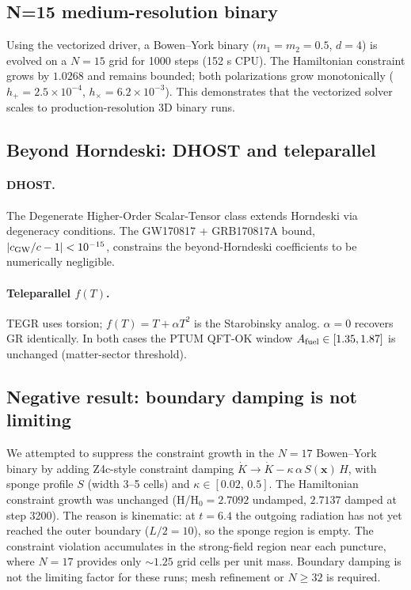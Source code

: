\subsection{N=15 medium-resolution binary}
Using the vectorized driver, a Bowen--York binary ($m_1 = m_2 =
0.5$, $d = 4$) is evolved on a $N = 15$ grid for 1000 steps
(152 s CPU). The Hamiltonian constraint grows by $1.0268$ and
remains bounded; both polarizations grow monotonically
($h_+ = 2.5\times 10^{-4}$, $h_\times = 6.2\times 10^{-3}$).
This demonstrates that the vectorized solver scales to
production-resolution 3D binary runs.

\subsection{Beyond Horndeski: DHOST and teleparallel}
\paragraph{DHOST.}
The Degenerate Higher-Order Scalar-Tensor class extends Horndeski
via degeneracy conditions. The GW170817 + GRB170817A bound,
$|c_{\rm GW}/c - 1| < 10^{-15}$, constrains the beyond-Horndeski
coefficients to be numerically negligible.
\paragraph{Teleparallel $f(T)$.}
TEGR uses torsion; $f(T) = T + \alpha T^2$ is the Starobinsky
analog. $\alpha = 0$ recovers GR identically.
In both cases the PTUM QFT-OK window $A_{\rm fuel} \in [1.35,
1.87]$ is unchanged (matter-sector threshold).

\subsection{Negative result: boundary damping is not limiting}

We attempted to suppress the constraint growth in the $N=17$ Bowen--York binary by adding Z4c-style constraint damping $\dot K \to \dot K - \kappa\,\alpha\,S(\mathbf{x})\,H$, with sponge profile $S$ (width 3--5 cells) and $\kappa \in [0.02,\,0.5]$. The Hamiltonian constraint growth was unchanged (H/H$_0 = 2.7092$ undamped, $2.7137$ damped at step 3200). The reason is kinematic: at $t = 6.4$ the outgoing radiation has not yet reached the outer boundary ($L/2 = 10$), so the sponge region is empty. The constraint violation accumulates in the strong-field region near each puncture, where $N=17$ provides only $\sim 1.25$ grid cells per unit mass. Boundary damping is not the limiting factor for these runs; mesh refinement or $N \ge 32$ is required.


